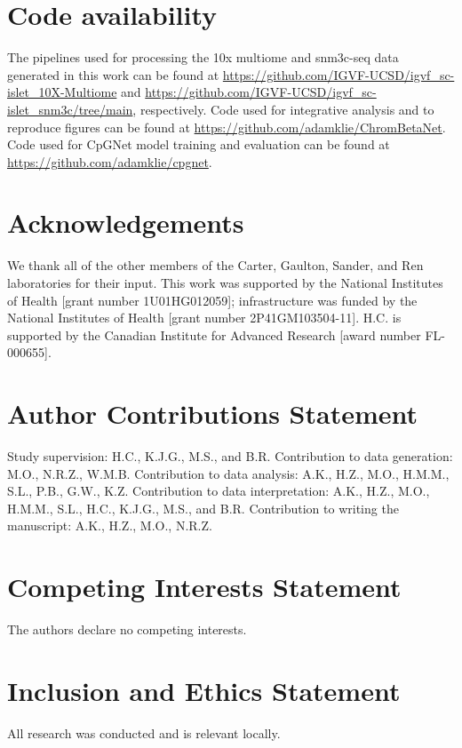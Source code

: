 \section{Code availability}

The pipelines used for processing the 10x multiome and snm3c-seq data generated in this work can be found at \url{https://github.com/IGVF-UCSD/igvf_sc-islet_10X-Multiome} and \url{https://github.com/IGVF-UCSD/igvf_sc-islet_snm3c/tree/main}, respectively. Code used for integrative analysis and to reproduce figures can be found at \url{https://github.com/adamklie/ChromBetaNet}. Code used for CpGNet model training and evaluation can be found at \url{https://github.com/adamklie/cpgnet}.

\section{Acknowledgements}

We thank all of the other members of the Carter, Gaulton, Sander, and Ren laboratories for their input. This work was supported by the National Institutes of Health [grant number 1U01HG012059]; infrastructure was funded by the National Institutes of Health [grant number 2P41GM103504-11]. H.C. is supported by the Canadian Institute for Advanced Research [award number FL-000655].

\section{Author Contributions Statement}

Study supervision: H.C., K.J.G., M.S., and B.R. Contribution to data generation: M.O., N.R.Z., W.M.B. Contribution to data analysis: A.K., H.Z., M.O., H.M.M., S.L., P.B., G.W., K.Z. Contribution to data interpretation: A.K., H.Z., M.O., H.M.M., S.L., H.C., K.J.G., M.S., and B.R. Contribution to writing the manuscript: A.K., H.Z., M.O., N.R.Z.

\section{Competing Interests Statement}

The authors declare no competing interests.

\section{Inclusion and Ethics Statement}

All research was conducted and is relevant locally.
